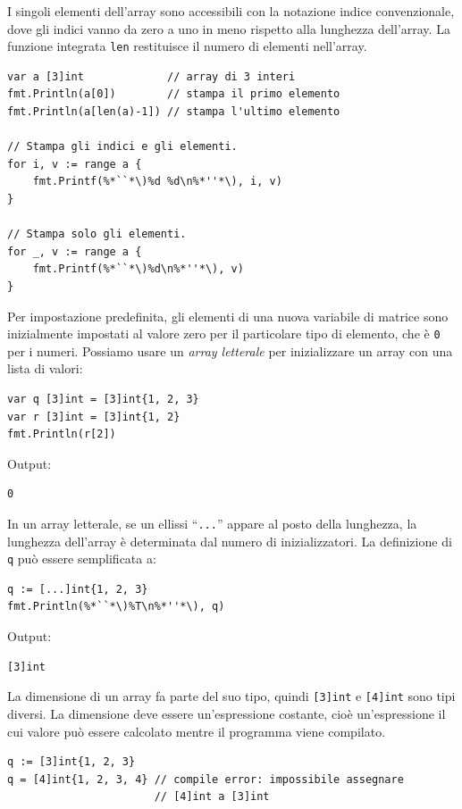 I singoli elementi dell'array sono accessibili con la notazione indice convenzionale, dove gli indici vanno da zero a uno in meno rispetto alla lunghezza dell'array.
La funzione integrata \verb|len| restituisce il numero di elementi nell'array.
\begin{lstlisting}[frame=single, label={lst:lstlisting3-1.1}]
var a [3]int             // array di 3 interi
fmt.Println(a[0])        // stampa il primo elemento
fmt.Println(a[len(a)-1]) // stampa l'ultimo elemento

// Stampa gli indici e gli elementi.
for i, v := range a {
    fmt.Printf(%*``*\)%d %d\n%*''*\), i, v)
}

// Stampa solo gli elementi.
for _, v := range a {
    fmt.Printf(%*``*\)%d\n%*''*\), v)
}
\end{lstlisting}
Per impostazione predefinita, gli elementi di una nuova variabile di matrice sono inizialmente impostati al valore zero per il particolare tipo di elemento, che è \verb|0| per i numeri.
Possiamo usare un \textit{array letterale} per inizializzare un array con una lista di valori:
\begin{lstlisting}[frame=single, label={lst:lstlisting3-1.2}]
var q [3]int = [3]int{1, 2, 3}
var r [3]int = [3]int{1, 2}
fmt.Println(r[2])
\end{lstlisting}
Output:
\begin{lstlisting}[language=bash, frame=L, label={lst:lstlisting3-1.3}]
0
\end{lstlisting}
In un array letterale, se un ellissi ``\verb|...|'' appare al posto della lunghezza, la lunghezza dell'array è determinata dal numero di inizializzatori.
La definizione di \verb|q| può essere semplificata a:
\begin{lstlisting}[frame=single, label={lst:lstlisting3-1.4}]
q := [...]int{1, 2, 3}
fmt.Println(%*``*\)%T\n%*''*\), q)
\end{lstlisting}
Output:
\begin{lstlisting}[language=bash, frame=L, label={lst:lstlisting3-1.5}]
[3]int
\end{lstlisting}
La dimensione di un array fa parte del suo tipo, quindi \verb|[3]int| e \verb|[4]int| sono tipi diversi.
La dimensione deve essere un'espressione costante, cioè un'espressione il cui valore può essere calcolato mentre il programma viene compilato.
\begin{lstlisting}[frame=single, label={lst:lstlisting3-1.6}]
q := [3]int{1, 2, 3}
q = [4]int{1, 2, 3, 4} // compile error: impossibile assegnare
                       // [4]int a [3]int
\end{lstlisting}
